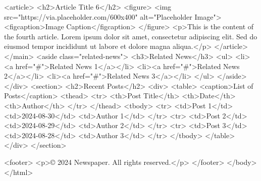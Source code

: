             <article>
                <h2>Article Title 6</h2>
                <figure>
                    <img src="https://via.placeholder.com/600x400" alt="Placeholder Image">
                    <figcaption>Image Caption</figcaption>
                </figure>
                <p>This is the content of the fourth article. Lorem ipsum dolor sit amet, consectetur adipiscing elit.
                    Sed do eiusmod tempor incididunt ut labore et dolore magna aliqua.</p>
            </article>
        </main>
        <aside class="related-news">
            <h3>Related News</h3>
            <ul>
                <li><a href="#">Related News 1</a></li>
                <li><a href="#">Related News 2</a></li>
                <li><a href="#">Related News 3</a></li>
            </ul>
       </aside>
    </div>
    <section>
        <h2>Recent Posts</h2>
        <div>
            <table>
                <caption>List of Posts</caption>
                <thead>
                    <tr>
                        <th>Post Title</th>
                        <th>Date</th>
                        <th>Author</th>
                    </tr>
                </thead>
                <tbody>
                    <tr>
                        <td>Post 1</td>
                        <td>2024-08-30</td>
                        <td>Author 1</td>
                    </tr>
                    <tr>
                        <td>Post 2</td>
                        <td>2024-08-29</td>
                        <td>Author 2</td>
                    </tr>
                    <tr>
                        <td>Post 3</td>
                        <td>2024-08-28</td>
                        <td>Author 3</td>
                    </tr>
                </tbody>
            </table>
        </div>
    </section>

    <footer>
        <p>© 2024 Newspaper. All rights reserved.</p>
    </footer>
</body>
</html>
